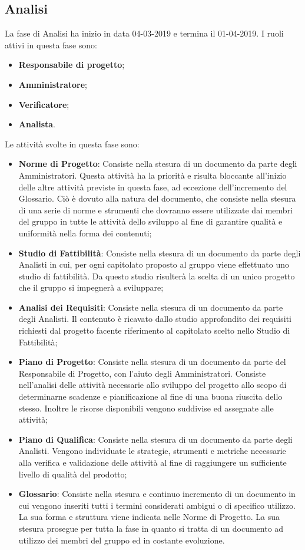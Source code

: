 \subsection{Analisi}
La fase di Analisi ha inizio in data 04-03-2019 e termina il 01-04-2019. I ruoli attivi in questa fase sono:
\begin{itemize}
    \item \textbf{Responsabile di progetto};
    \item \textbf{Amministratore};
    \item \textbf{Verificatore};
    \item\textbf{Analista}.
\end{itemize}
Le attività svolte in questa fase sono:
\begin{itemize}
    \item \textbf{Norme di Progetto}: Consiste nella stesura di un documento da parte degli Amministratori. Questa attività ha la priorità e risulta bloccante all'inizio delle altre attività previste in questa fase, ad eccezione dell'incremento del Glossario. Ciò è dovuto alla natura del documento, che consiste nella stesura di una serie di norme e strumenti che dovranno essere utilizzate dai membri del gruppo in tutte le attività dello sviluppo al fine di garantire qualità e uniformità nella forma dei contenuti;
    \item \textbf{Studio di Fattibilità}: Consiste nella stesura di un documento da parte degli Analisti in cui, per ogni capitolato proposto al gruppo viene effettuato uno studio di fattibilità. Da questo studio risulterà la scelta di un unico progetto che il gruppo si impegnerà a sviluppare;
    \item \textbf{Analisi dei Requisiti}: Consiste nella stesura di un documento da parte degli Analisti. Il contenuto è ricavato dallo studio approfondito dei requisiti richiesti dal progetto facente riferimento al capitolato scelto nello Studio di Fattibilità;
    \item \textbf{Piano di Progetto}: Consiste nella stesura di un documento da parte del Responsabile di Progetto, con l'aiuto degli Amministratori. Consiste nell'analisi delle attività necessarie allo sviluppo del progetto allo scopo di determinarne scadenze e pianificazione al fine di una buona riuscita dello stesso. Inoltre le risorse disponibili vengono suddivise ed assegnate alle attività;
    \item \textbf{Piano di Qualifica}: Consiste nella stesura di un documento da parte degli Analisti. Vengono individuate le strategie, strumenti e metriche necessarie alla verifica e validazione delle attività al fine di raggiungere un sufficiente livello di qualità del prodotto;
    \item \textbf{Glossario}:  Consiste nella stesura e continuo incremento di un documento in cui vengono inseriti tutti i termini considerati ambigui o di specifico utilizzo. La sua forma e struttura viene indicata nelle Norme di Progetto. La sua stesura prosegue per tutta la fase in quanto si tratta di un documento ad utilizzo dei membri del gruppo ed in costante evoluzione.
\end{itemize}
